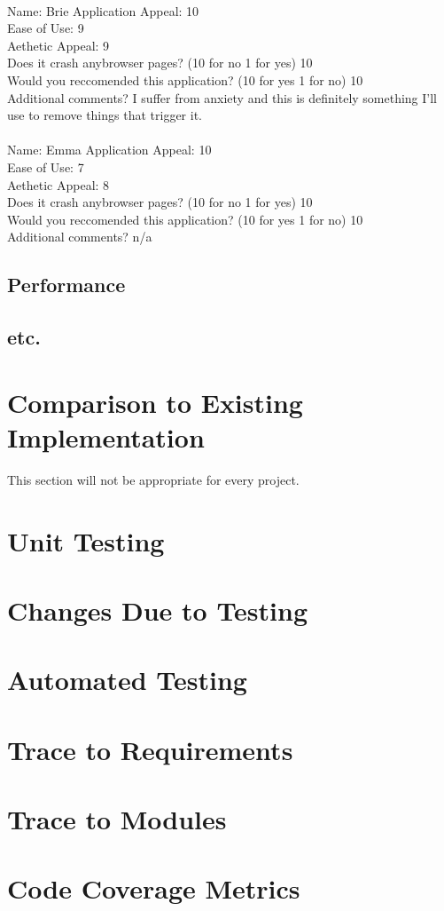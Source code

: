 \documentclass[12pt, titlepage]{article}
\begin{document}
\\
Name: Brie
Application Appeal: 10 \\ 
Ease of Use: 9\\ 
Aethetic Appeal: 9\\ 
Does it crash anybrowser pages? (10 for no 1 for yes) 10\\ 
Would you reccomended this application? (10 for yes 1 for no) 10\\ 
Additional comments? I suffer from anxiety and this is definitely something I'll use to remove things that trigger it.\\

\\
Name: Emma
Application Appeal: 10 \\ 
Ease of Use: 7\\ 
Aethetic Appeal: 8\\ 
Does it crash anybrowser pages? (10 for no 1 for yes) 10\\ 
Would you reccomended this application? (10 for yes 1 for no) 10\\ 
Additional comments? n/a\\
\subsection{Performance}
\subsection{etc.}
	
\section{Comparison to Existing Implementation}	
This section will not be appropriate for every project.
\section{Unit Testing}
\section{Changes Due to Testing}
\section{Automated Testing}
		
\section{Trace to Requirements}
		
\section{Trace to Modules}		
\section{Code Coverage Metrics}
\end{document}
